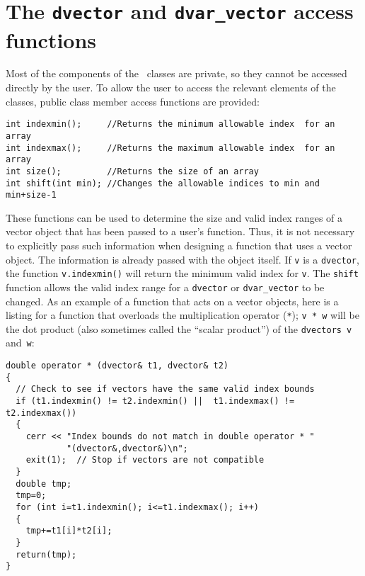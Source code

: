 \documentclass{admbmanual}
\begin{document}
\section{The \texttt{dvector} and \texttt{dvar\_vector} access functions}

Most of the components of the \scAD\ classes are private, so
they cannot be accessed directly by the user. To allow the user 
to access the relevant elements of the classes,
public class member access functions are provided:
\begin{lstlisting}
int indexmin();     //Returns the minimum allowable index  for an array
int indexmax();     //Returns the maximum allowable index  for an array
int size();         //Returns the size of an array
int shift(int min); //Changes the allowable indices to min and min+size-1
\end{lstlisting}

These functions can be used to determine the size and valid index ranges of
a vector object that has been passed to a user's function. Thus,
it is not necessary to explicitly pass such information when designing
a function that uses a vector object. The information is
already passed with the object itself.
If \texttt{v} is a \texttt{dvector}, the function \texttt{v.indexmin()} will
return the minimum valid index for \texttt{v}. The \texttt{shift} function allows
the valid index range for a \texttt{dvector} or \texttt{dvar\_vector} to be
changed.
As an example of a function that
acts on a vector objects, here is a listing for a function that overloads
the multiplication operator (\texttt{*}); \texttt{v * w} will be 
the dot product (also sometimes called the ``scalar product'')
of the \texttt{dvectors}~\texttt{v} and~\texttt{w}:
\begin{lstlisting}
double operator * (dvector& t1, dvector& t2)
{
  // Check to see if vectors have the same valid index bounds
  if (t1.indexmin() != t2.indexmin() ||  t1.indexmax() != t2.indexmax())  
  {
    cerr << "Index bounds do not match in double operator * "
            "(dvector&,dvector&)\n";
    exit(1);  // Stop if vectors are not compatible
  }
  double tmp;
  tmp=0;
  for (int i=t1.indexmin(); i<=t1.indexmax(); i++)
  {
    tmp+=t1[i]*t2[i];
  }
  return(tmp);
}
\end{lstlisting}
\end{document}
